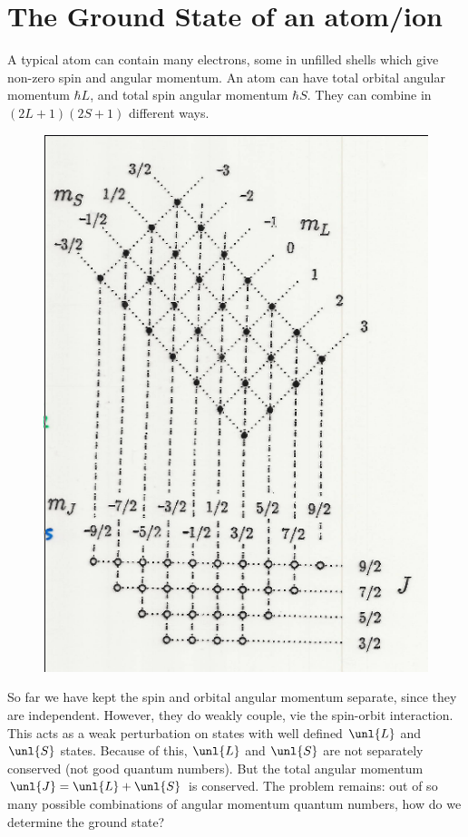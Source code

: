 \documentclass[a4paper, 11pt, normalem]{report}
\begin{document}
\section{The Ground State of an atom/ion}
A typical atom can contain many electrons, some in unfilled shells which give non-zero spin and angular momentum. 
An atom can have total orbital angular momentum $\hbar L$, and total spin angular momentum $\hbar S$.
They can combine in $(2L+1)(2S+1)$ different ways. 
\begin{figure}[H]
    \centering
    \includegraphics[scale=0.5]{combs.png}
\end{figure}
So far we have kept the spin and orbital angular momentum separate, since they are independent.
However, they do weakly couple, vie the spin-orbit interaction. 
This acts as a weak perturbation on states with well defined $\unl{L}$ and $\unl{S}$ states.
Because of this, $\unl{L}$ and $\unl{S}$ are not separately conserved (not good quantum numbers).
But the total angular momentum $\unl{J} = \unl{L}+\unl{S}$ is conserved.
The problem remains: out of so many possible combinations of angular momentum quantum numbers, how do we determine the ground state?
\end{document}
